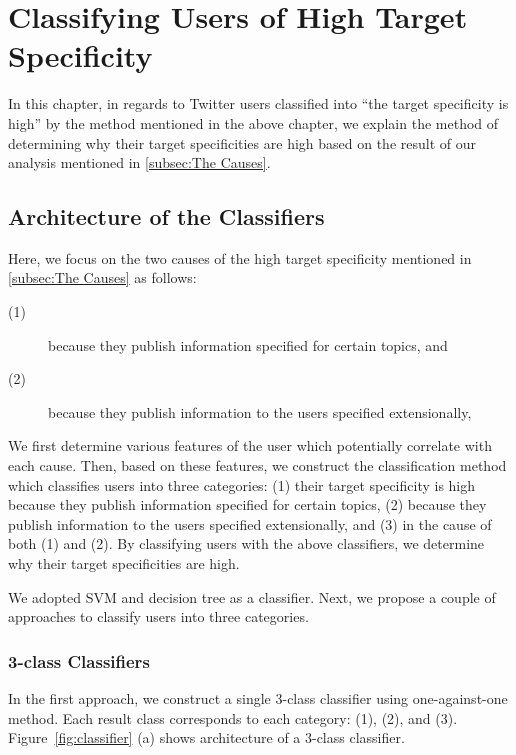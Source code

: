 \section{Classifying Users of High Target Specificity}
\label{sec:ClassificationMethod2}

In this chapter, in regards to Twitter users classified into ``the
target specificity is high'' by the method mentioned in the above
chapter, we explain the method of determining why their target
specificities are high based on the result of our analysis mentioned in
\ref{subsec:The Causes}.

\subsection{Architecture of the Classifiers}
\label{subsec:Architecture}

Here, we focus on the two causes of the high target specificity
mentioned in \ref{subsec:The Causes} as follows:
\begin{description}
 \item[(1)] because they publish information specified for certain
            topics, and
 \item[(2)] because they publish information to the users specified
            extensionally,
\end{description}


We first determine various features of the user which potentially
correlate with each cause.  Then, based on these features, we construct
the classification method which classifies users into three categories:
(1) their target specificity is high because they publish information
specified for certain topics, (2) because they publish information to
the users specified extensionally, and (3) in the cause of both (1) and
(2).  By classifying users with the above classifiers, we determine why
their target specificities are high.

We adopted SVM and decision tree as a classifier.  Next, we propose a
couple of approaches to classify users into three categories.

\subsubsection{3-class Classifiers}
\label{subsubsec:3-class}

In the first approach, we construct a single 3-class classifier using
one-against-one method.  Each result class corresponds to each category:
(1), (2), and (3).  Figure~\ref{fig:classifier} (a) shows architecture
of a 3-class classifier.

